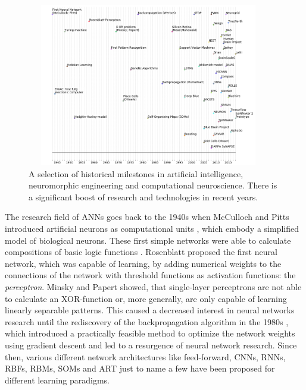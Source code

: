 \begin{figure}[t!]
	\centering
	\includegraphics[width=0.95\textwidth,height=270px]{imgs/Neuromorphic_Timeline_beta.png}
	\caption{A selection of historical milestones in artificial intelligence, neuromorphic engineering and computational neuroscience. There is a significant boost of research and technologies in recent years.}
	\label{fig:neuro_time}
\end{figure}
The research field of \aclp{ANN} goes back to the 1940s when McCulloch and Pitts introduced artificial neurons as computational units \cite{McCulloch1943}, which embody a simplified model of biological neurons.
These first simple networks were able to calculate compositions of basic logic functions \cite{McCulloch1943, Rojas1996}.
Rosenblatt \cite{Rosenblatt58} proposed the first neural network, which was capable of learning, by adding numerical weights to the connections of the network with threshold functions as activation functions: the \textit{perceptron}.
Minsky and Papert \cite{Minsky1969} showed, that single-layer perceptrons are not able to calculate an XOR-function or, more generally, are only capable of learning linearly separable patterns.
This caused a decreased interest in neural networks research until the rediscovery of the backpropagation algorithm \cite{Werbos1974} in the 1980s \cite{Rumelhart1986}, which introduced a practically feasible method to optimize the network weights using gradient descent and led to a resurgence of neural network research.
Since then, various different network architectures like feed-forward, \acp{CNN}, \acp{RNN}, \acp{RBF}, \acp{RBM}, \acp{SOM} and \ac{ART} just to name a few \cite{Schmidhuber2015} have been proposed for different learning paradigms.
